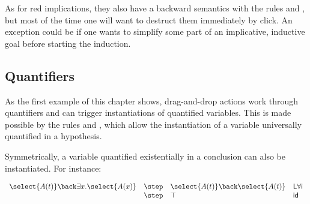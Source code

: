 

As for red implications, they also have a backward semantics with the rules
 and , but most of the time one
will want to destruct them immediately by click. An exception could be if one
wants to simplify some part of an implicative, inductive goal before starting
the induction.

\subsection{Quantifiers}
As the first example of this chapter shows, drag-and-drop actions work through
quantifiers and can trigger instantiations of quantified variables. This is made
possible by the rules  and , which allow the
instantiation of a variable universally quantified in a hypothesis.

Symmetrically, a variable quantified existentially in a conclusion can
also be instantiated. For instance:

$$\begin{array}{llll}
    \select{A(t)}\back \exists x.\select{A(x)}&\step&
                                                      \select{A(t)}\back\select{A(t)}&\mathsf{L}\forall\mathsf{i}
    \\
                                               &\step& \top&\mathsf{id}
  \end{array}
  $$

